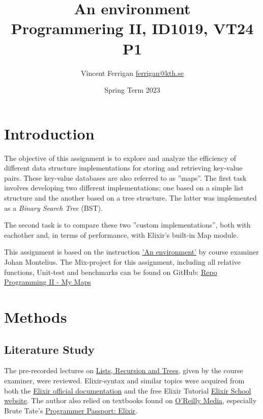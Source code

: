 \documentclass[a4paper,11pt]{article}
\begin{document}
\title{
    An environment
\\\small{Programmering II, ID1019, VT24 P1}
}
\author{Vincent Ferrigan \href{mailto:ferrigan@kth.se}{ferrigan@kth.se}}

\date{Spring Term 2023}

\maketitle

\section*{Introduction}
\label{sec:introduction}
The objective of this assignment is to explore and analyze
the efficiency of
different data structure implementations for storing
and retrieving key-value pairs.
These key-value databases are also referred to as ''maps''.
The first task involves developing two different implementations;
one based on a simple list structure and the
another based on a tree structure.
The latter was implemented as a \emph{Binary Search Tree} (BST).

The second task is to compare these two ''custom implementations'',
both with eachother and, in terms of performance, with
Elixir's built-in Map module.

This assignment is based on the instruction
\href{https://people.kth.se/~johanmon/courses/id1019/seminars/environment/environment.pdf}{'An environment'}
by course examiner Johan Montelius.
The Mix-project for this assignment, including all relative functions, Unit-test and benchmarks can be found on GitHub:
\href{https://github.com/VincentFerrigan/kth-id1019-programming-ii/tree/main/tasks/2/mymaps}{Repo Programming II - My Maps}%

\section*{Methods}
\label{sec:methods}

\subsection*{Literature Study}
\label{subsec:methods}
The pre-recorded lectures on
\href{https://canvas.kth.se/courses/44911/assignments/syllabus}{Lists, Recursion and Trees},
given by the course examiner, were reviewed.
Elixir-syntax and similar topics were acquired
from both the
\href{https://elixir-lang.org/docs.html}{Elixir official documentation}
and the free Elixir Tutorial
\href{https://elixirschool.com/en}{Elixir School
website}.
The author also relied on textbooks found on
\href{https://learning.oreilly.com}{O'Reilly Media},
especially Brute Tate's
\href{https://learning.oreilly.com/library/view/programmer-passport-elixir/9781680509649/}{Programmer Passport: Elixir}.
\end{document}
